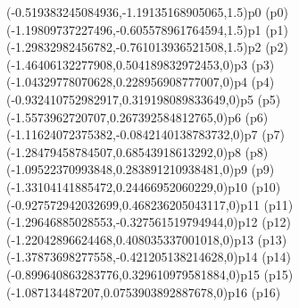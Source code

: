 \psPoint(-0.519383245084936,-1.19135168905065,1.5){p0}
\psdot[dotstyle=Bo,fillcolor=darkgray](p0)
\psPoint(-1.19809737227496,-0.605578961764594,1.5){p1}
\psdot[dotstyle=Bo,fillcolor=darkgray](p1)
\psPoint(-1.29832982456782,-0.761013936521508,1.5){p2}
\psdot[dotstyle=Bo,fillcolor=darkgray](p2)
\psPoint(-1.46406132277908,0.504189832972453,0){p3}
\psdot[dotstyle=Btriangle,fillcolor=darkgray](p3)
\psPoint(-1.04329778070628,0.228956908777007,0){p4}
\psdot[dotstyle=Btriangle,fillcolor=darkgray](p4)
\psPoint(-0.932410752982917,0.319198089833649,0){p5}
\psdot[dotstyle=Btriangle,fillcolor=darkgray](p5)
\psPoint(-1.5573962720707,0.267392584812765,0){p6}
\psdot[dotstyle=Btriangle,fillcolor=darkgray](p6)
\psPoint(-1.11624072375382,-0.0842140138783732,0){p7}
\psdot[dotstyle=Btriangle,fillcolor=darkgray](p7)
\psPoint(-1.28479458784507,0.68543918613292,0){p8}
\psdot[dotstyle=Btriangle,fillcolor=darkgray](p8)
\psPoint(-1.09522370993848,0.283891210938481,0){p9}
\psdot[dotstyle=Btriangle,fillcolor=darkgray](p9)
\psPoint(-1.33104141885472,0.24466952060229,0){p10}
\psdot[dotstyle=Btriangle,fillcolor=darkgray](p10)
\psPoint(-0.927572942032699,0.468236205043117,0){p11}
\psdot[dotstyle=Btriangle,fillcolor=darkgray](p11)
\psPoint(-1.29646885028553,-0.327561519794944,0){p12}
\psdot[dotstyle=Btriangle,fillcolor=darkgray](p12)
\psPoint(-1.22042896624468,0.408035337001018,0){p13}
\psdot[dotstyle=Btriangle,fillcolor=darkgray](p13)
\psPoint(-1.37873698277558,-0.421205138214628,0){p14}
\psdot[dotstyle=Btriangle,fillcolor=darkgray](p14)
\psPoint(-0.899640863283776,0.329610979581884,0){p15}
\psdot[dotstyle=Btriangle,fillcolor=darkgray](p15)
\psPoint(-1.087134487207,0.0753903892887678,0){p16}
\psdot[dotstyle=Btriangle,fillcolor=darkgray](p16)
